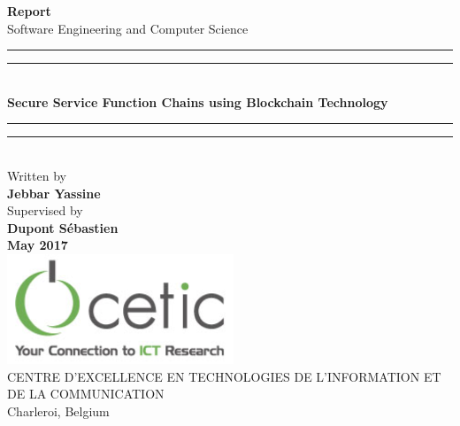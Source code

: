 \begin{titlepage}

\begin{center}
\vspace*{-1.25cm}
\textup{\small {\bf Report } \\ [0.3cm] Software Engineering and Computer Science}\\[0.4in]

\rule{\textwidth}{1.6pt}\vspace*{-\baselineskip}\vspace*{2pt} %
\rule{\textwidth}{0.4pt}\\[\baselineskip] %
\LARGE \textbf {Secure Service Function Chains using Blockchain Technology}\\[0.15cm]
\rule{\textwidth}{1.6pt}\vspace*{-\baselineskip}\vspace*{2pt} %
\rule{\textwidth}{0.4pt}\\[\baselineskip] %
       



\small Written by \\[0.15cm]
{\textbf{\small Jebbar Yassine}}\\[0.35in]  



\small Supervised by \\
{\textbf{\small Dupont Sébastien }}\\
[2cm]
\large{\textbf{May 2017}}\\
[3.0cm]

\includegraphics[scale=0.62]{cetic} \\[0.5cm]

\normalsize
\textsc{CENTRE D'EXCELLENCE EN TECHNOLOGIES DE L'INFORMATION ET DE LA COMMUNICATION}\\[0.2cm]
 Charleroi, Belgium \\
\vspace{0.35cm}


\end{center}

\end{titlepage}
